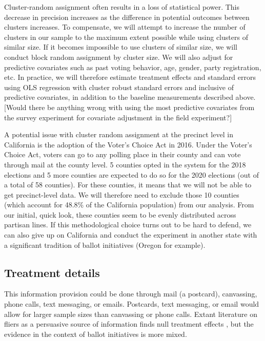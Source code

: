 \documentclass[12pt,final,fleqn]{article}
\theoremstyle{plain}
\begin{document}
Cluster-random assignment often results in a loss of statistical power. This decrease in precision increases as the difference in potential outcomes between clusters increases. To compensate, we will attempt to increase the number of clusters in our sample to the maximum extent possible while using clusters of similar size. If it becomes impossible to use clusters of similar size, we will conduct block random assignment by cluster size. We will also adjust for predictive covariates such as past voting behavior, age, gender, party registration, etc. In practice, we will therefore estimate treatment effects and standard errors using OLS regression with cluster robust standard errors and inclusive of predictive covariates, in addition to the baseline measurements described above. [Would there be anything wrong with using the most predictive covariates from the survey experiment for covariate adjustment in the field experiment?]

A potential issue with cluster random assignment at the precinct level in California is the adoption of the Voter's Choice Act in 2016. Under the Voter's Choice Act, voters can go to any polling place in their county and can vote through mail at the county level. 5 counties opted in the system for the 2018 elections and 5 more counties are expected to do so for the 2020 elections (out of a total of 58 counties). For these counties, it means that we will not be able to get precinct-level data. We will therefore need to exclude those 10 counties (which account for 48.8\% of the California population) from our analysis. From our initial, quick look, these counties seem to be evenly distributed across partisan lines. If this methodological choice turns out to be hard to defend, we can also give up on California and conduct the experiment in another state with a significant tradition of ballot initiatives (Oregon for example). 


\subsection{Treatment details} \label{sec: treatment}

This information provision could be done through mail (a postcard), canvassing, phone calls, text messaging, or emails. Postcards, text messaging, or email would allow for larger sample sizes than canvassing or phone calls. Extant literature on fliers as a persuasive source of information finds null treatment effects \citep{kalla2018minimal, incerti2019corruption}, but the evidence in the context of ballot initiatives is more mixed. 
\end{document}
